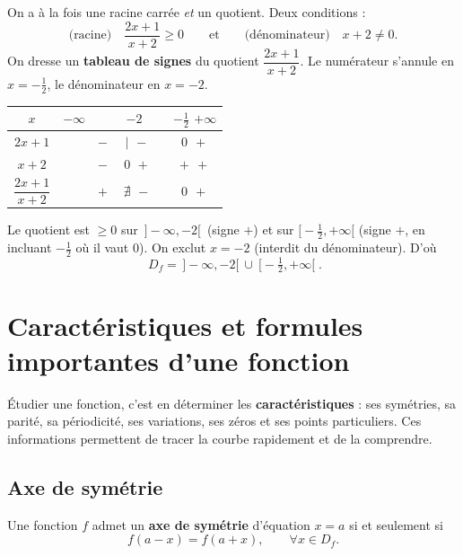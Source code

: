 \documentclass[11pt,a4paper]{article}
\newcommand{\Df}{D_f}
\begin{document}
\begin{exemple}[Domaine d'une racine de quotient : $f(x)=\sqrt{\dfrac{2x+1}{x+2}}$]
On a à la fois une racine carrée \emph{et} un quotient. Deux conditions :
\[
  \text{(racine)}\quad \frac{2x+1}{x+2}\geq 0 \qquad\text{et}\qquad
  \text{(dénominateur)}\quad x+2\neq 0.
\]
On dresse un \textbf{tableau de signes} du quotient $\dfrac{2x+1}{x+2}$.
Le numérateur s'annule en $x=-\frac12$, le dénominateur en $x=-2$.

\begin{center}
\renewcommand{\arraystretch}{1.5}
\begin{tabular}{|c|c c c c c|}
\hline
$x$ & $-\infty$ & & $-2$ & & $-\tfrac12$ \hspace{1.2cm} $+\infty$ \\
\hline
$2x+1$ & & $-$ & $\;|\;$ $-$ & & $0\ \ +$ \\
\hline
$x+2$ & & $-$ & $\;0\;$ $+$ & & $+\ \ +$ \\
\hline
$\dfrac{2x+1}{x+2}$ & & $+$ & $\;\nexists\;$ $-$ & & $0\ \ +$ \\
\hline
\end{tabular}
\end{center}

Le quotient est $\geq 0$ sur $\,]-\infty,-2[\,$ (signe $+$) et sur
$\big[-\tfrac12,+\infty\big[$ (signe $+$, en incluant $-\tfrac12$ où il vaut $0$).
On exclut $x=-2$ (interdit du dénominateur). D'où
\[
  \boxed{\;\Df = \,]-\infty,-2[\ \cup\ \Big[-\tfrac12,+\infty\Big[\;.}
\]
\end{exemple}

\section{Caractéristiques et formules importantes d'une fonction}
Étudier une fonction, c'est en déterminer les \textbf{caractéristiques} : ses symétries,
sa parité, sa périodicité, ses variations, ses zéros et ses points particuliers. Ces
informations permettent de tracer la courbe rapidement et de la comprendre.

\subsection{Axe de symétrie}

\begin{definition}
Une fonction $f$ admet un \textbf{axe de symétrie} d'équation $x=a$ si et seulement si
\[
  f(a-x)=f(a+x),\qquad \forall x\in\Df .
\]
\end{definition}
\end{document}
